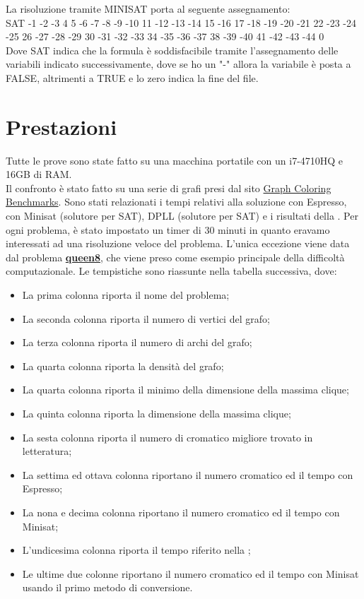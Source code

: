 \documentclass[a4paper,11pt]{article} %
\begin{document}
La risoluzione tramite MINISAT porta al seguente assegnamento:\\
SAT
-1 -2 -3 4 5 -6 -7 -8 -9 -10 11 -12 -13 -14 15 -16 17 -18 -19 -20 -21 22 -23 -24 -25 26 -27 -28 -29 30 -31 -32 -33 34 -35 -36 -37 38 -39 -40 41 -42 -43 -44 0\\
Dove SAT indica che la formula è soddisfacibile tramite l'assegnamento delle variabili indicato successivamente, dove se ho un "-" allora la variabile è posta a FALSE, altrimenti a TRUE e lo zero indica la fine del file.

\pagebreak

\section{Prestazioni}
Tutte le prove sono state fatto su una macchina portatile con un i7-4710HQ e 16GB di RAM.\\
Il confronto è stato fatto su una serie di grafi presi dal sito \href{https://sites.google.com/site/graphcoloring/vertex-coloring}{Graph Coloring Benchmarks}. Sono stati relazionati i tempi relativi alla soluzione con Espresso, con Minisat \cite{minisat} (solutore per SAT), DPLL \cite{dpll}(solutore per SAT) e i risultati della \cite{tesi}.
Per ogni problema, è stato impostato un timer di 30 minuti in quanto eravamo interessati ad una risoluzione veloce del problema. L'unica eccezione viene data dal problema \href{https://it.wikipedia.org/wiki/Rompicapo_delle_otto_regine}{\textbf{queen8}}, che viene preso come esempio principale della difficoltà computazionale.
Le tempistiche sono riassunte nella tabella successiva, dove:
\begin{itemize}
	\item La prima colonna riporta il nome del problema;
	\item La seconda colonna riporta il numero di vertici del grafo;
	\item La terza colonna riporta il numero di archi del grafo;
	\item La quarta colonna riporta la densità del grafo;
	\item La quarta colonna riporta il minimo della dimensione della massima clique;
	\item La quinta colonna riporta la dimensione della massima clique;
	\item La sesta colonna riporta il numero di cromatico migliore trovato in letteratura;
	\item La settima ed ottava colonna riportano il numero cromatico ed il tempo con Espresso;
	\item La nona e decima colonna riportano il numero cromatico ed il tempo con Minisat;
	\item L'undicesima colonna riporta il tempo riferito nella \cite{tesi};
	\item Le ultime due colonne riportano il numero cromatico ed il tempo con Minisat usando il primo metodo di conversione.
\end{itemize}
\end{document}
